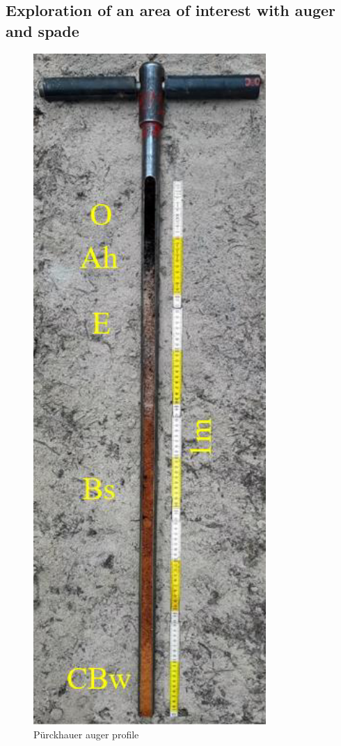 \documentclass[
  letterpaper,
  DIV=11,
  numbers=noendperiod]{scrreprt}
\begin{document}
\hypertarget{exploration-of-an-area-of-interest-with-auger-and-spade}{%
\subsection{Exploration of an area of interest with auger and
spade}\label{exploration-of-an-area-of-interest-with-auger-and-spade}}

\begin{figure}

{\centering \includegraphics{./figure_8-2.png}

}

\caption{Pürckhauer auger profile}

\end{figure}
\end{document}
